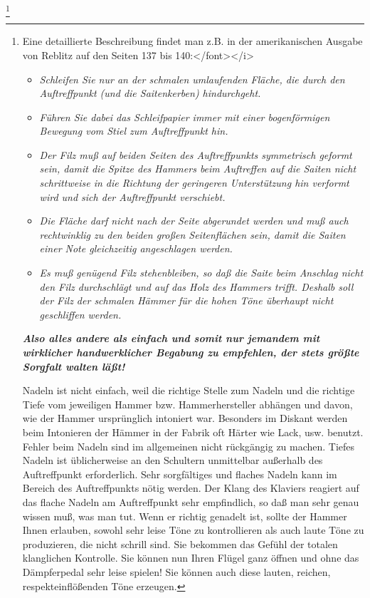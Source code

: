 \footnote{Eine detaillierte Beschreibung findet man z.B. in der amerikanischen Ausgabe von Reblitz auf den Seiten 137 bis 140:</font></i>

\begin{itemize} 
\item \textit{Schleifen Sie nur an der schmalen umlaufenden Fläche, die durch den Auftreffpunkt (und die Saitenkerben) hindurchgeht.}
\item \textit{Führen Sie dabei das Schleifpapier immer mit einer bogenförmigen Bewegung vom Stiel zum Auftreffpunkt hin.}
\item \textit{Der Filz muß auf beiden Seiten des Auftreffpunkts symmetrisch geformt sein, damit die Spitze des Hammers beim Auftreffen auf die Saiten nicht schrittweise in die Richtung der geringeren Unterstützung hin verformt wird und sich der Auftreffpunkt verschiebt.}
\item \textit{Die Fläche darf nicht nach der Seite abgerundet werden und muß auch rechtwinklig zu den beiden großen Seitenflächen sein, damit die Saiten einer Note gleichzeitig angeschlagen werden.}
\item \textit{Es muß genügend Filz stehenbleiben, so daß die Saite beim Anschlag nicht den Filz durchschlägt und auf das Holz des Hammers trifft.
Deshalb soll der Filz der schmalen Hämmer für die hohen Töne überhaupt nicht geschliffen werden.}
 \end{itemize}
\textit{\textbf{Also alles andere als einfach und somit nur jemandem mit wirklicher handwerklicher Begabung zu empfehlen, der stets größte Sorgfalt walten läßt!}}

Nadeln ist nicht einfach, weil die richtige Stelle zum Nadeln und die richtige Tiefe vom jeweiligen Hammer bzw. Hammerhersteller abhängen und davon, wie der Hammer ursprünglich intoniert war.
Besonders im Diskant werden beim Intonieren der Hämmer in der Fabrik oft Härter wie Lack, usw. benutzt.
Fehler beim Nadeln sind im allgemeinen nicht rückgängig zu machen.
Tiefes Nadeln ist üblicherweise an den Schultern unmittelbar außerhalb des Auftreffpunkt erforderlich.
Sehr sorgfältiges und flaches Nadeln kann im Bereich des Auftreffpunkts nötig werden.
Der Klang des Klaviers reagiert auf das flache Nadeln am Auftreffpunkt sehr empfindlich, so daß man sehr genau wissen muß, was man tut.
Wenn er richtig genadelt ist, sollte der Hammer Ihnen erlauben, sowohl sehr leise Töne zu kontrollieren als auch laute Töne zu produzieren, die nicht schrill sind.
Sie bekommen das Gefühl der totalen klanglichen Kontrolle.
Sie können nun Ihren Flügel ganz öffnen und ohne das Dämpferpedal sehr leise spielen!
Sie können auch diese lauten, reichen, respekteinflößenden Töne erzeugen.
 

}
